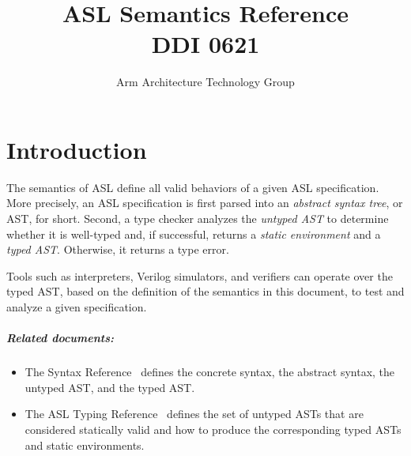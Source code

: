 \documentclass{book}
\author{Arm Architecture Technology Group}
\title{ASL Semantics Reference \\
       DDI 0621}
\begin{document}
\maketitle

\tableofcontents{}





\chapter{Introduction}

The semantics of ASL define all valid behaviors of a given ASL specification.
More precisely, an ASL specification is first parsed into an \emph{abstract syntax tree},
or AST, for short. Second, a type checker analyzes the \emph{untyped AST} to determine whether it
is well-typed and, if successful, returns a \emph{static environment} and a \emph{typed AST}.
Otherwise, it returns a type error.

Tools such as interpreters, Verilog simulators, and verifiers can operate over the typed AST, based on the definition
of the semantics in this document, to test and analyze a given specification.

\paragraph{Related documents:}
\begin{itemize}
  \item The Syntax Reference~\cite{ASLAbstractSyntaxReference} defines the concrete syntax, the abstract syntax, the untyped AST,
        and the typed AST.
  \item The ASL Typing Reference~\cite{ASLTypingReference} defines the set of untyped ASTs that are considered statically valid
  and how to produce the corresponding typed ASTs and static environments.
\end{itemize}
\end{document}
